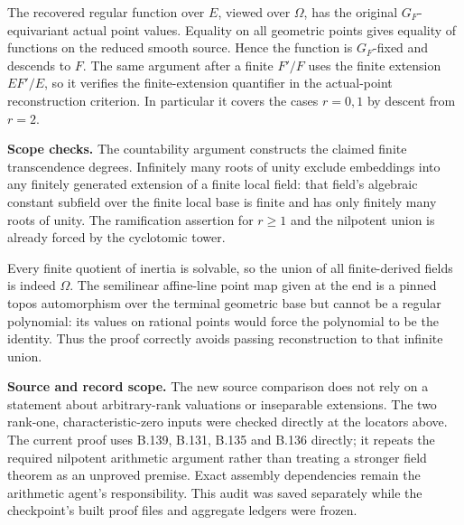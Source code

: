 The recovered regular function over $E$, viewed
over $\Omega$, has the original $G_F$-equivariant
actual point values.  Equality on all geometric
points gives equality of functions on the reduced
smooth source.  Hence the function is $G_F$-fixed
and descends to $F$.  The same argument after a
finite $F'/F$ uses the finite extension $EF'/E$,
so it verifies the finite-extension quantifier in
the actual-point reconstruction criterion.  In
particular it covers the cases $r=0,1$ by descent
from $r=2$.

\medskip\noindent\textbf{Scope checks.}
The countability argument constructs the claimed
finite transcendence degrees.  Infinitely many
roots of unity exclude embeddings into any
finitely generated extension of a finite local
field: that field's algebraic constant subfield
over the finite local base is finite and has only
finitely many roots of unity.  The ramification
assertion for $r\ge1$ and the nilpotent union is
already forced by the cyclotomic tower.

Every finite quotient of inertia is solvable, so
the union of all finite-derived fields is indeed
$\Omega$.  The semilinear affine-line point map
given at the end is a pinned topos automorphism
over the terminal geometric base but cannot be a
regular polynomial: its values on rational points
would force the polynomial to be the identity.
Thus the proof correctly avoids passing
reconstruction to that infinite union.

\medskip\noindent\textbf{Source and record scope.}
The new source comparison does not rely on a
statement about arbitrary-rank valuations or
inseparable extensions.  The two rank-one,
characteristic-zero inputs were checked directly
at the locators above.  The current proof uses
B.139, B.131, B.135 and B.136 directly; it repeats
the required nilpotent arithmetic argument rather
than treating a stronger field theorem as an
unproved premise.  Exact assembly dependencies
remain the arithmetic agent's responsibility.
This audit was saved separately while the
checkpoint's built proof files and aggregate
ledgers were frozen.
